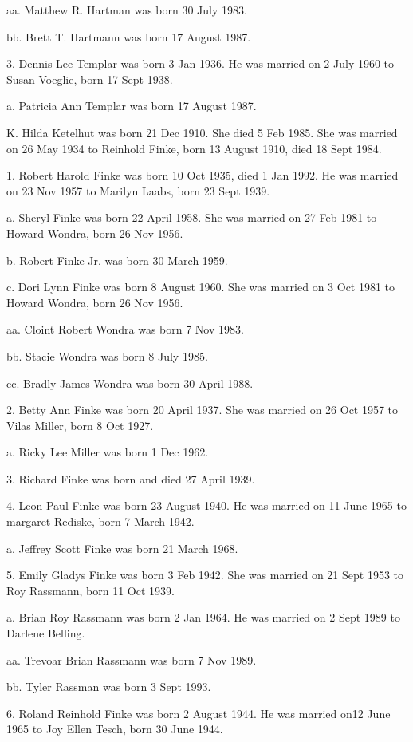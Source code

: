 \documentclass[a4paper]{article}
\begin{document}
aa. Matthew R. Hartman was born 30 July 1983.

bb. Brett T. Hartmann was born 17 August 1987.

3. Dennis Lee Templar was born 3 Jan 1936.  He was married on 2 July 1960 to Susan Voeglie, born 17 Sept 1938.

a. Patricia Ann Templar was born 17 August 1987.

K. Hilda Ketelhut was born 21 Dec 1910.  She died 5 Feb 1985.  She was married on 26 May 1934 to Reinhold Finke, born 13 August 1910, died 18 Sept 1984.

1. Robert Harold Finke was born 10 Oct 1935, died 1 Jan 1992.  He was married on 23 Nov 1957 to Marilyn Laabs, born 23 Sept 1939.

a. Sheryl Finke was born 22 April 1958.  She was married on 27 Feb 1981 to Howard Wondra, born 26 Nov 1956.

b. Robert Finke Jr. was born 30 March 1959.

c. Dori Lynn Finke was born 8 August 1960.  She was married on 3 Oct 1981 to Howard Wondra, born 26 Nov 1956.  

aa. Cloint Robert Wondra was born 7 Nov 1983.

bb. Stacie Wondra was born 8 July 1985.

cc. Bradly James Wondra was born 30 April 1988.

2. Betty Ann Finke was born 20 April  1937.  She was married on 26 Oct 1957 to Vilas Miller, born 8 Oct 1927.

a. Ricky Lee Miller was born 1 Dec 1962.

3. Richard Finke was born and died 27 April 1939.

4. Leon Paul Finke was born 23 August 1940.  He was married on 11 June 1965 to margaret Rediske, born 7 March 1942.

a. Jeffrey Scott Finke was born 21 March 1968.

5. Emily Gladys Finke was born 3 Feb 1942.  She was married on 21 Sept 1953 to Roy Rassmann, born 11 Oct 1939. 

a. Brian Roy Rassmann was born 2 Jan 1964.  He was married on 2 Sept 1989 to Darlene Belling.

aa. Trevoar Brian Rassmann was born 7 Nov 1989.

bb. Tyler Rassman was born 3 Sept 1993.

6. Roland Reinhold Finke was born 2 August 1944.  He was married on12 June 1965 to Joy Ellen Tesch, born 30 June 1944.
\end{document}
